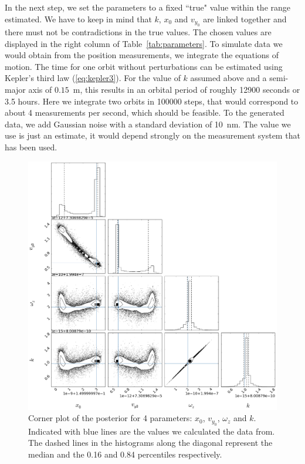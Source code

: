 \documentclass[]{rsos}
\begin{document}
In the next step, we set the parameters to a fixed ``true" value
within the range estimated. We have to keep in mind that $k$, $x_0$
and $v_{y_0}$ are linked together and there must not be contradictions
in the true values. The chosen values are displayed in the right
column of Table~\ref{tab:parameters}.  To simulate data we would
obtain from the position measurements, we integrate the equations of
motion. The time for one orbit without perturbations can be estimated
using Kepler's third law (\ref{eq:kepler3}). For the value of $k$
assumed above and a semi-major axis of $0.15$~m, this
results in an orbital period of roughly 12900 seconds or
3.5 hours. Here we integrate two orbits in 100000
steps, that would correspond to about 4 measurements per second,
which should be feasible. To the generated data, we add Gaussian noise
with a standard deviation of 10~nm. The value we use is just an estimate,
it would depend strongly on the measurement system that has been used.

\begin{figure}%
	\centering
	\includegraphics[width=1.0\textwidth]{img/4cornerfit.png}
	\caption{Corner plot of the posterior for 4 parameters: $x_0$, $v_{y_0}$, $\omega_z$ and $k$. Indicated with blue lines are the values we calculated the data from. The dashed lines in the histograms along the diagonal represent the median and the 0.16 and 0.84 percentiles respectively.}
	\label{fig:plotCorner4}
\end{figure}
\end{document}
